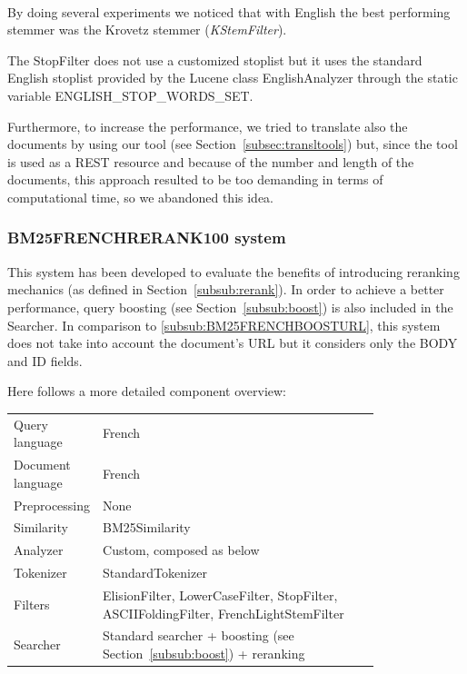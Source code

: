 \\
By doing several experiments we noticed that with English the best performing stemmer was the Krovetz stemmer (\textit{KStemFilter}).
\par
The StopFilter does not use a customized stoplist but it uses the standard English stoplist provided by the Lucene class EnglishAnalyzer through the static variable ENGLISH\_STOP\_WORDS\_SET.
\par
Furthermore, to increase the performance, we tried to translate also the documents by using our tool (see Section~\ref{subsec:transltools}) but, since the tool is used as a REST resource and because of the number and length of the documents, this approach resulted to be too demanding in terms of computational time, so we abandoned this idea.

\subsubsection{BM25FRENCHRERANK100 system}
\label{subsub:BM25FRENCHRERANK100}
This system has been developed to evaluate the benefits of introducing reranking mechanics (as defined in Section~\ref{subsub:rerank}).
In order to achieve a better performance, query boosting (see Section~\ref{subsub:boost}) is also included in the Searcher. In comparison to  \ref{subsub:BM25FRENCHBOOSTURL}, this system does not take into account the document's URL but it considers only the BODY and ID fields.
\par Here follows a more detailed component overview:
\begin{table}[h!]
    \centering
    \begin{tabular}{l p{0.8\linewidth}}
    Query language & French\\
    Document language & French\\
    Preprocessing & None\\
    Similarity & BM25Similarity\\
    Analyzer & Custom, composed as below\\
    Tokenizer & StandardTokenizer\\
    Filters & ElisionFilter, LowerCaseFilter, StopFilter, ASCIIFoldingFilter, FrenchLightStemFilter\\
    Searcher & Standard searcher + boosting (see Section~\ref{subsub:boost}) + reranking
    \end{tabular}
\end{table}
